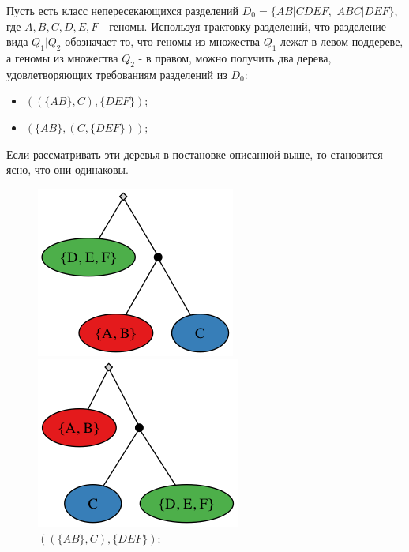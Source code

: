 \begin{example}
  Пусть есть класс непересекающихся разделений $D_0 = \{AB|CDEF,$ $ABC|DEF\}$, где $A, B, C, D, E, F$ - геномы.
  Используя трактовку разделений, что разделение вида $Q_1|Q_2$ обозначает то, что геномы из множества $Q_1$ лежат в левом поддереве,
  а геномы из множества $Q_2$ - в правом, можно получить два дерева, удовлетворяющих требованиям разделений из $D_0$:
  \begin{itemize}
    \item $((\{AB\}, C), \{DEF\});$
    \item $(\{AB\}, (C, \{DEF\}));$
  \end{itemize}
  Если рассматривать эти деревья в постановке описанной выше, то становится ясно, что они одинаковы.
  \begin{figure}[H]
    \centering
      \includegraphics[max width=\linewidth]{fig/2/similar_tree1.png}
      \caption{$((\{AB\}, C), \{DEF\});$}
    \endminipage \hfill
      \includegraphics[max width=\linewidth]{fig/2/similar_tree2.png}

\end{figure}
\end{example}
